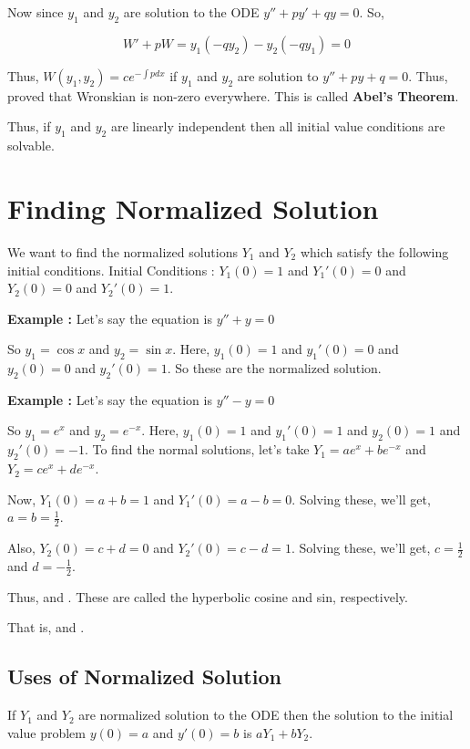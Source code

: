 Now since $y_1$ and $y_2$ are solution to the ODE $y'' + py' + qy = 0$.
So, 

$$
W' + pW = y_1( - q y_2 ) - y_2( - q y_1 ) = 0
$$ 

Thus, $W(y_1, y_2) = c e^{- \int p dx}$ if $y_1$ and $y_2$ are solution to $y'' + py + q = 0$.
Thus, proved that Wronskian is non-zero everywhere.
This is called {\bf Abel's Theorem}.

Thus, if $y_1$ and $y_2$ are linearly independent then all initial value conditions are solvable.


\section{Finding Normalized Solution}

We want to find the normalized solutions $Y_1$ and $Y_2$ which satisfy the following initial conditions.
Initial Conditions : $Y_1(0) = 1$ and $Y_1'(0) = 0$ and $Y_2(0) = 0$ and $Y_2'(0) = 1$.

{\bf Example : } Let's say the equation is $y'' + y = 0$

So $y_1 = \cos x$ and $y_2 = \sin x$.
Here, $y_1(0) = 1$ and $y_1'(0) = 0$ and $y_2(0) = 0$ and $y_2'(0) = 1$.
So these are the normalized solution.

{\bf Example : } Let's say the equation is $y'' - y = 0$

So $y_1 = e^x$ and $y_2 = e^{-x}$.
Here, $y_1(0) = 1$ and $y_1'(0) = 1$ and $y_2(0) = 1$ and $y_2'(0) = -1$.
To find the normal solutions, let's take $Y_1 = ae^x + be^{-x}$ and $Y_2 = ce^x + de^{-x}$.

Now, $Y_1(0) = a + b = 1 $ and $Y_1'(0) = a - b = 0$.
Solving these, we'll get, $a = b = \frac{1}{2}$.

Also, $Y_2(0) = c + d = 0$ and $Y_2'(0) = c - d = 1$.
Solving these, we'll get, $c = \frac{1}{2}$ and $d = -\frac{1}{2}$.

Thus,  and .
These are called the hyperbolic cosine and sin, respectively.

That is,  and .


\subsection{Uses of Normalized Solution}

If $Y_1$ and $Y_2$ are normalized solution to the ODE then the solution 
to the initial value problem $y(0) = a$ and $y'(0) = b$ is $a Y_1 + b Y_2$.



